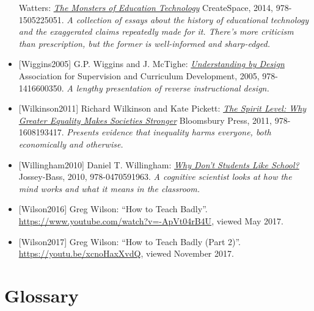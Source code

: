 \documentclass[10pt,statementpaper]{memoir}
\begin{document}
\begin{itemize}
{  Watters:
  \emph{\href{https://www.amazon.com/Monsters-Education-Technology-Audrey-Watters/dp/1505225051/}{The
  Monsters of Education Technology}} CreateSpace, 2014, 978-1505225051.
  \emph{A collection of essays about the history of educational
  technology and the exaggerated claims repeatedly made for it. There's
  more criticism than prescription, but the former is well-informed and
  sharp-edged.}}
\item
  \protect\hypertarget{wiggins-mctighe}{}{{[}Wiggins2005{]}} G.P.
  Wiggins and J. McTighe:
  \emph{\href{https://www.amazon.com/Understanding-Design-Grant-Wiggins/dp/1416600353/}{Understanding
  by Design}} Association for Supervision and Curriculum Development,
  2005, 978-1416600350. \emph{A lengthy presentation of reverse
  instructional design.}
\item
  \protect\hypertarget{wilkinson-pickett-spirit-level}{}{{[}Wilkinson2011{]}}
  Richard Wilkinson and Kate Pickett:
  \emph{\href{https://www.amazon.com/Spirit-Level-Equality-Societies-Stronger/dp/1608193411/}{The
  Spirit Level: Why Greater Equality Makes Societies Stronger}}
  Bloomsbury Press, 2011, 978-1608193417. \emph{Presents evidence that
  inequality harms everyone, both economically and otherwise.}
\item
  \protect\hypertarget{willingham-dont-like-school}{}{{[}Willingham2010{]}}
  Daniel T. Willingham:
  \emph{\href{https://www.amazon.com/Why-Dont-Students-Like-School/dp/047059196X/}{Why
  Don't Students Like School?}} Jossey-Bass, 2010, 978-0470591963.
  \emph{A cognitive scientist looks at how the mind works and what it
  means in the classroom.}
\item
  \protect\hypertarget{wilson-bad-teaching-live}{}{{[}Wilson2016{]}}
  Greg Wilson: ``How to Teach Badly''.
  \url{https://www.youtube.com/watch?v=-ApVt04rB4U}, viewed May 2017.
\item
  \protect\hypertarget{wilson-bad-teaching-recorded}{}{{[}Wilson2017{]}}
  {Greg Wilson: ``How to Teach Badly (Part 2)''.
  \url{https://youtu.be/xcnoHaxXvdQ}, viewed November 2017.}
\end{itemize}

\chapter{Glossary}\label{glossary}
\end{document}
